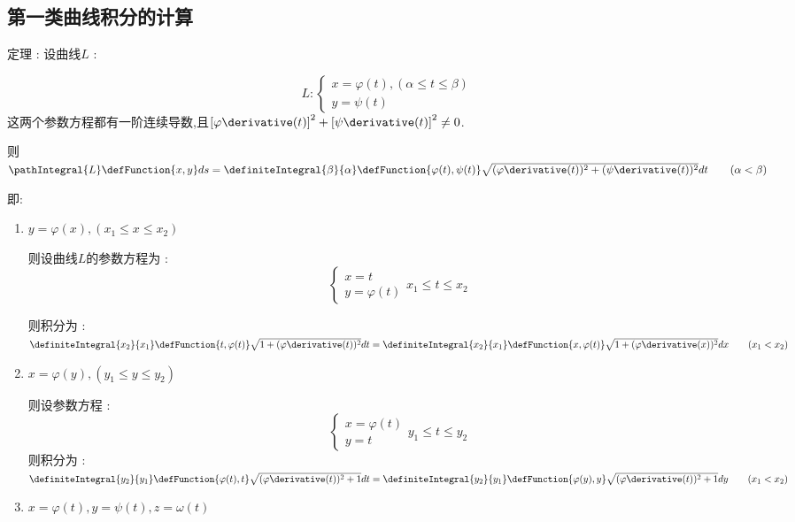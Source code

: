 {{  \subsection{第一类曲线积分的计算}{
    定理 : 设曲线$L$ :
    \begin{center}
      $$
        L :
        \begin{cases}
          x = \varphi(t),(\alpha \leq t \leq \beta) \\
          y = \psi(t)
        \end{cases}
      $$
      这两个参数方程都有一阶连续导数,且$\left[\varphi\derivative(t)\right]^2 + \left[\psi\derivative(t)\right]^2 \neq 0$.
    \end{center}

    则$\pathIntegral{L}\defFunction{x,y}ds = \definiteIntegral{\beta}{\alpha}\defFunction{\varphi(t),\psi(t)}\sqrt{(\varphi\derivative(t))^2 + (\psi\derivative(t))^2}dt\qquad (\alpha < \beta)$

    即:
    \begin{enumerate}
      \item {
            $y = \varphi(x),(x_1 \leq x \leq x_2)$

            则设曲线$L$的参数方程为 :
            $$
              \begin{cases}
                x = t \\
                y = \varphi(t)
              \end{cases}
              x_1 \leq t \leq x_2
            $$

            则积分为 : $\definiteIntegral{x_2}{x_1}\defFunction{t,\varphi(t)}\sqrt{1 + (\varphi\derivative(t))^2}dt = \definiteIntegral{x_2}{x_1}\defFunction{x,\varphi(t)}\sqrt{1 + (\varphi\derivative(x))^2}dx\qquad (x_1 < x_2)$
            }
      \item {
            $x = \varphi(y),(y_1 \leq y \leq y_2)$

            则设参数方程 :
            $$
              \begin{cases}
                x = \varphi(t) \\
                y = t
              \end{cases}
              y_1 \leq t \leq y_2
            $$
            则积分为 : $\definiteIntegral{y_2}{y_1}\defFunction{\varphi(t),t}\sqrt{(\varphi\derivative(t))^2 + 1}dt = \definiteIntegral{y_2}{y_1}\defFunction{\varphi(y),y}\sqrt{(\varphi\derivative(t))^2 + 1}dy\qquad (x_1 < x_2)$
            }
      \item{
            $x = \varphi(t),y = \psi(t),z = \omega(t)$

}
\end{enumerate}}}}
